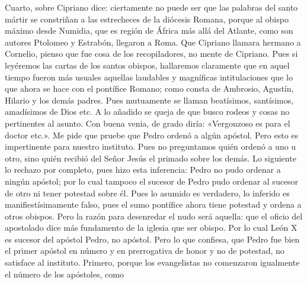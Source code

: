 Cuarto, sobre Cipriano dice: ciertamente no puede ser que las palabras del santo mártir se constriñan a las estrecheces de la diócesis Romana, porque al obispo máximo desde Numidia, que es región de África más allá del Atlante, como son autores Ptolomeo y Estrabón, llegaron a Roma. Que Cipriano llamara hermano a Cornelio, pienso que fue cosa de los recopiladores, no mente de Cipriano. Pues si leyéremos las cartas de los santos obispos, hallaremos claramente que en aquel tiempo fueron más usuales aquellas laudables y magníficas intitulaciones que lo que ahora se hace con el pontífice Romano; como consta de Ambrosio, Agustín, Hilario y los demás padres. Pues mutuamente se llaman beatísimos, santísimos, amadísimos de Dios etc. A lo añadido se queja de que busco rodeos y cosas no pertinentes al asunto. Con buena venia, de grado diría: «Vergonzoso es para el doctor etc.». Me pide que pruebe que Pedro ordenó a algún apóstol. Pero esto es impertinente para nuestro instituto. Pues no preguntamos quién ordenó a uno u otro, sino quién recibió del Señor Jesús el primado sobre los demás. Lo siguiente lo rechazo por completo, pues hizo esta inferencia: Pedro no pudo ordenar a ningún apóstol; por lo cual tampoco el sucesor de Pedro pudo ordenar al sucesor de otro ni tener potestad sobre él. Pues lo asumido es verdadero, lo inferido es manifiestísimamente falso, pues el sumo pontífice ahora tiene potestad y ordena a otros obispos. Pero la razón para desenredar el nudo será aquella: que el oficio del apostolado dice más fundamento de la iglesia que ser obispo. Por lo cual León X es sucesor del apóstol Pedro, no apóstol. Pero lo que confiesa, que Pedro fue bien el primer apóstol en número y en prerrogativa de honor y no de potestad, no satisface al instituto. Primero, porque los evangelistas no comenzaron igualmente el número de los apóstoles, como

